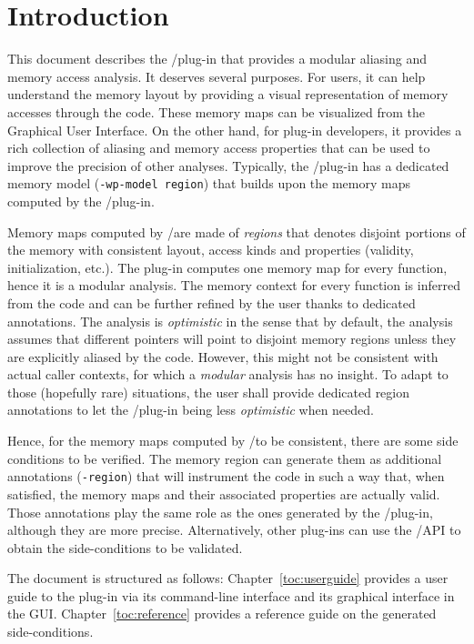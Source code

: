 \chapter*{Introduction}
\label{toc:introduction}

This document describes the \FramaC/\Region plug-in that provides a
modular aliasing and memory access analysis. It deserves several purposes. For
\FramaC users, it can help understand the memory layout by providing a visual
representation of memory accesses through the code. These memory maps can be
visualized from the \FramaC Graphical User Interface. On the other hand, for
\FramaC plug-in developers, it provides a rich collection of aliasing and memory
access properties that can be used to improve the precision of other analyses.
Typically, the \FramaC/\Wp plug-in has a dedicated memory model
(\verb$-wp-model region$) that builds upon the memory maps computed by the
\FramaC/\Region plug-in.

Memory maps computed by \FramaC/\Region are made of \emph{regions} that
denotes disjoint portions of the memory with consistent layout, access kinds and
properties (validity, initialization, etc.). The plug-in computes one memory map
for every function, hence it is a modular analysis. The memory context for every
function is inferred from the code and can be further refined by the user thanks
to dedicated \acsl annotations. The analysis is \emph{optimistic} in the sense
that by default, the analysis assumes that different pointers will point to
disjoint memory regions unless they are explicitly aliased by the code. However,
this might not be consistent with actual caller contexts, for which a
\emph{modular} analysis has no insight. To adapt to those (hopefully rare)
situations, the user shall provide dedicated region annotations to let the
\FramaC/\Region plug-in being less \emph{optimistic} when needed.

Hence, for the memory maps computed by \FramaC/\Region to be consistent,
there are some side conditions to be verified. The memory region can generate
them as additional \acsl annotations (\verb$-region$) that will instrument the
code in such a way that, when satisfied, the memory maps and their associated
properties are actually valid. Those annotations play the same role as the ones
generated by the \FramaC/\rte plug-in, although they are more precise.
Alternatively, other plug-ins can use the \FramaC/\Region API to obtain
the side-conditions to be validated.

The document is structured as follows: Chapter~\ref{toc:userguide} provides a
user guide to the \Region plug-in via its command-line interface and its
graphical interface in the GUI. Chapter~\ref{toc:reference} provides
a reference guide on the generated side-conditions.
